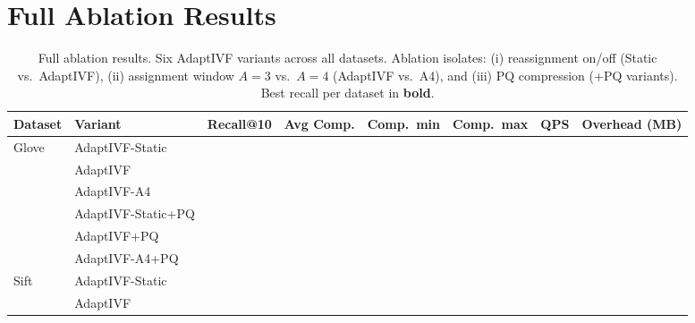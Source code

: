 \section{Full Ablation Results}
\label{sec:appendix:full_ablation}

\begin{table}[t]
\centering
\caption{Full ablation results.  Six AdaptIVF variants across all datasets.
         Ablation isolates: (i) reassignment on/off
         (Static vs.\ AdaptIVF), (ii) assignment window $A\!=\!3$
         vs.\ $A\!=\!4$ (AdaptIVF vs.\ A4), and (iii) PQ compression
         (+PQ variants).  Best recall per dataset in \textbf{bold}.}
\label{tab:appendix:full_ablation}
\small
\begin{tabular}{llrrrrrr}
\toprule
Dataset & Variant & Recall@10 & Avg Comp. & Comp.\ min & Comp.\ max & QPS & Overhead (MB) \\
\midrule
\multirow{6}{*}{Glove}
 & AdaptIVF-Static    & \placeholder{\_\_\_} & \placeholder{\_\_\_} & \placeholder{\_\_\_} & \placeholder{\_\_\_} & \placeholder{\_\_\_} & \placeholder{\_\_\_} \\
 & AdaptIVF           & \placeholder{\_\_\_} & \placeholder{\_\_\_} & \placeholder{\_\_\_} & \placeholder{\_\_\_} & \placeholder{\_\_\_} & \placeholder{\_\_\_} \\
 & AdaptIVF-A4        & \placeholder{\_\_\_} & \placeholder{\_\_\_} & \placeholder{\_\_\_} & \placeholder{\_\_\_} & \placeholder{\_\_\_} & \placeholder{\_\_\_} \\
 & AdaptIVF-Static+PQ & \placeholder{\_\_\_} & \placeholder{\_\_\_} & \placeholder{\_\_\_} & \placeholder{\_\_\_} & \placeholder{\_\_\_} & \placeholder{\_\_\_} \\
 & AdaptIVF+PQ        & \placeholder{\_\_\_} & \placeholder{\_\_\_} & \placeholder{\_\_\_} & \placeholder{\_\_\_} & \placeholder{\_\_\_} & \placeholder{\_\_\_} \\
 & AdaptIVF-A4+PQ     & \placeholder{\_\_\_} & \placeholder{\_\_\_} & \placeholder{\_\_\_} & \placeholder{\_\_\_} & \placeholder{\_\_\_} & \placeholder{\_\_\_} \\
\midrule
\multirow{6}{*}{Sift}
 & AdaptIVF-Static    & \placeholder{\_\_\_} & \placeholder{\_\_\_} & \placeholder{\_\_\_} & \placeholder{\_\_\_} & \placeholder{\_\_\_} & \placeholder{\_\_\_} \\
 & AdaptIVF           & \placeholder{\_\_\_} & \placeholder{\_\_\_} & \placeholder{\_\_\_} & \placeholder{\_\_\_} & \placeholder{\_\_\_} & \placeholder{\_\_\_} \\

\end{tabular}
\end{table}
